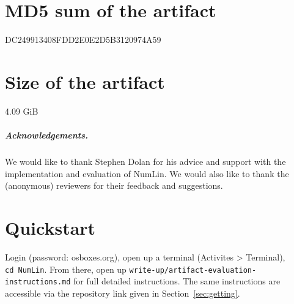 \documentclass[a4paper,UKenglish]{darts-v2019}
\newcommand{\mdsum}[1]{{\section{MD5 sum of the artifact}#1}}
\newcommand{\artifactsize}[1]{{\section{Size of the artifact}#1}}
\begin{document}
\mdsum{DC249913408FDD2E0E2D5B3120974A59}

\artifactsize{4.09 GiB}

\subparagraph*{Acknowledgements.}

We would like to thank Stephen Dolan for his advice and support with the
implementation and evaluation of NumLin. We would also like to thank the
(anonymous) reviewers for their feedback and suggestions.

\appendix

\section{Quickstart}

Login (password: osboxes.org), open up a terminal (Activites > Terminal),
\texttt{cd\ NumLin}. From there, open up
\texttt{write-up/artifact-evaluation-instructions.md} for full detailed
instructions. The same instructions are accessible via the repository link
given in Section~\ref{sec:getting}.



%

\end{document}
